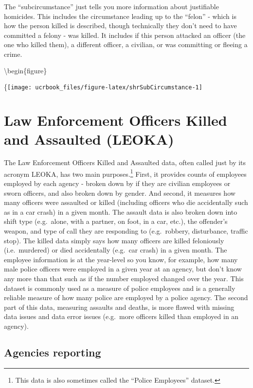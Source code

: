 \documentclass[
  12pt,
  openany]{book}
\begin{document}
The ``subcircumstance'' just tells you more information about justifiable homicides. This includes the circumstance leading up to the ``felon'' - which is how the person killed is described, though technically they don't need to have committed a felony - was killed. It includes if this person attacked an officer (the one who killed them), a different officer, a civilian, or was committing or fleeing a crime.

\textbackslash begin\{figure\}

\{\centering \texttt{[image: ucrbook\_files/figure-latex/shrSubCircumstance-1]}

\hypertarget{leoka}{%
\chapter{Law Enforcement Officers Killed and Assaulted (LEOKA)}\label{leoka}}

The Law Enforcement Officers Killed and Assaulted data, often called just by its acronym LEOKA, has two main purposes.\footnote{This data is also sometimes called the ``Police Employees'' dataset.} First, it provides counts of employees employed by each agency - broken down by if they are civilian employees or sworn officers, and also broken down by gender. And second, it measures how many officers were assaulted or killed (including officers who die accidentally such as in a car crash) in a given month. The assault data is also broken down into shift type (e.g.~alone, with a partner, on foot, in a car, etc.), the offender's weapon, and type of call they are responding to (e.g.~robbery, disturbance, traffic stop). The killed data simply says how many officers are killed feloniously (i.e.~murdered) or died accidentally (e.g.~car crash) in a given month. The employee information is at the year-level so you know, for example, how many male police officers were employed in a given year at an agency, but don't know any more than that such as if the number employed changed over the year. This dataset is commonly used as a measure of police employees and is a generally reliable measure of how many police are employed by a police agency. The second part of this data, measuring assaults and deaths, is more flawed with missing data issues and data error issues (e.g.~more officers killed than employed in an agency).

\hypertarget{agencies-reporting-4}{%
\section{Agencies reporting}\label{agencies-reporting-4}}
\end{document}
